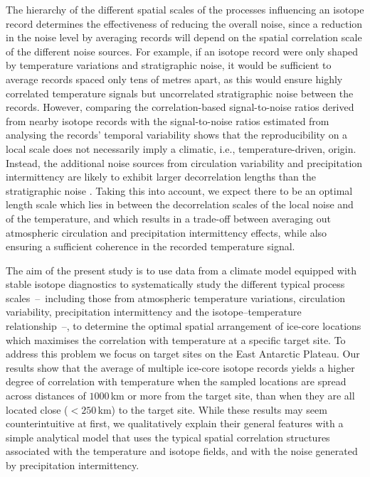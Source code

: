\documentclass[cp, manuscript]{copernicus}
\begin{document}
The hierarchy of the different spatial scales of the processes influencing an
isotope record determines the effectiveness of reducing the overall noise, since
a reduction in the noise level by averaging records will depend on the spatial
correlation scale of the different noise sources. For example, if an isotope
record were only shaped by temperature variations and stratigraphic noise, it
would be sufficient to average records spaced only tens of metres apart, as this
would ensure highly correlated temperature signals but uncorrelated
stratigraphic noise between the records. However, comparing the
correlation-based signal-to-noise ratios derived from nearby isotope records
\citep{Munch2016,Munch2017} with the signal-to-noise ratios estimated from
analysing the records' temporal variability \citep{Laepple2018} shows that the
reproducibility on a local scale does not necessarily imply a climatic, i.e.,
temperature-driven, origin. Instead, the additional noise sources from
circulation variability and precipitation intermittency are likely to exhibit
larger decorrelation lengths than the stratigraphic noise
\citep{Laepple2018,Munch2018a}. Taking this into account, we expect there to be
an optimal length scale which lies in between the decorrelation scales of the
local noise and of the temperature, and which results in a trade-off between
averaging out atmospheric circulation and precipitation intermittency effects,
while also ensuring a sufficient coherence in the recorded temperature signal.

The aim of the present study is to use data from a climate model equipped with
stable isotope diagnostics to systematically study the different typical process
scales~--~including those from atmospheric temperature variations, circulation
variability, precipitation intermittency and the isotope--temperature
relationship~--, to determine the optimal spatial arrangement of ice-core
locations which maximises the correlation with temperature at a specific target
site. To address this problem we focus on target sites on the East Antarctic
Plateau. Our results show that the average of multiple ice-core isotope records
yields a higher degree of correlation with temperature when the sampled
locations are spread across distances of $1000$\,km or more from the target
site, than when they are all located close ($<250$\,km) to the target
site. While these results may seem counterintuitive at first, we qualitatively
explain their general features with a simple analytical model that uses the
typical spatial correlation structures associated with the temperature and
isotope fields, and with the noise generated by precipitation intermittency.
\end{document}
